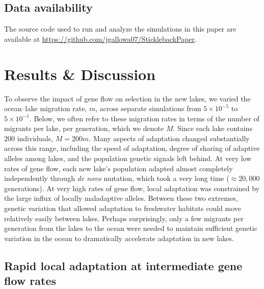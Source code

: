\documentclass{article}
\begin{document}
\subsection*{Data availability}

The source code used to run and analyze the simulations in this paper
are available at \url{https://github.com/jgallowa07/SticklebackPaper}.

\section*{Results \& Discussion}

To observe the impact of gene flow on selection in the new lakes, we varied the ocean--lake migration rate, $m$, across separate simulations from $5 \times 10^{-5}$ to $5 \times 10^{-1}$. 
Below, we often refer to these migration rates in terms of the number of migrants per lake, per generation, which we denote $M$. Since each lake contains 200 individuals, $M=200m$. 
Many aspects of adaptation changed substantially across this range, including the speed of adaptation, degree of sharing of adaptive alleles among lakes, and the population genetic signals left behind. 
At very low rates of gene flow, each new lake's population adapted almost completely independently through \emph{de novo} mutation, which took a very long time ($\approx 20,000$ generations). 
At very high rates of gene flow, local adaptation was constrained by the large influx of locally maladaptive alleles. %
Between these two extremes, genetic variation that allowed adaptation to freshwater habitats could move relatively easily between lakes. 
Perhaps surprisingly, only a few migrants per generation from the lakes to the ocean were needed to maintain sufficient genetic variation in the ocean to dramatically accelerate adaptation in new lakes.

\subsection*{Rapid local adaptation at intermediate gene flow rates}
\end{document}
